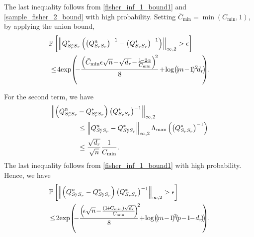 The last inequality follows from \eqref{fisher_inf_1_bound1} and \eqref{sample_fisher_2_bound} with high probability. Setting $\bar{C}_{\min}=\min\left(C_{\min},1\right)$, by applying the union bound,
\begin{equation}
\begin{aligned}
&\mathbb{P}\left[\norm{\fisher^*_{\support^c_\svert\support_\svert} \left(\left(\fisher^n_{\support_\svert\support_\svert}\right)^{-1} -\left(\fisher^*_{\support_\svert\support_\svert}\right)^{-1}\right)}{\infty,2}>\epsilon\right]\\
&\leq\! 4\!\exp\!\left(\!\!-\frac{\left(\bar{C}_{\min}\epsilon\sqrt{n}\!-\!\sqrt{d_\svert}\!-\!\frac{1\!-2\alpha}{C_{\min}}\right)^{\!2}}{8}\!+\!\log\!\left(\!(\!m\!-\!1\!)^2\!d_\svert\!\right)\!\!\!\right)\!\!.
\end{aligned}
\nonumber
\end{equation}

For the second term, we have
\begin{equation}
\begin{aligned}
&\left\|\left(Q^n_{S^c_{r}S_{r}}-Q^*_{S^c_{r}S_{r}}\right) \left(Q^*_{S_{r}S_{r}}\right)^{-1}\right\|_{\infty,2}\\ &\qquad\qquad\leq \left\|Q^n_{S^c_{r}S_{r}}-Q^*_{S^c_{r}S_{r}}\right\|_{\infty,2} \Lambda_{\max}\left(\left(Q^*_{S_{r}S_{r}}\right)^{-1}\right)\\
&\qquad\qquad\leq\frac{\sqrt{d_{r}}}{\sqrt{n}}\frac{1}{C_{\min}}.
\end{aligned}
\nonumber
\end{equation}
The last inequality follows from \eqref{fisher_inf_1_bound1} with high probability. Hence, we have
\begin{equation}
\begin{aligned}
&\mathbb{P}\left[\norm{\left(\fisher^n_{\support^c_\svert\support_\svert} -\fisher^*_{\support^c_\svert\support_\svert}\right) \left(\fisher^*_{\support_\svert\support_\svert}\right)^{-1}}{\infty,2}>\epsilon\right]\\ &\!\leq\! 2\!\exp\!\left(\!\!-\frac{\left(\!\epsilon\sqrt{n}\!-\!\frac{\left(1\!+\!C_{\min}\right)\sqrt{d_\svert}}{C_{\min}}\!\right)^{\!2}\!\!}{8}\!+\!\log\!\left(\!(\!m\!-\!1\!)^{\!2}\!(\!p\!-\!1\!\!-\!d_\svert\!)\!\right)\!\!\!\right)\!\!.
\end{aligned}
\nonumber
\end{equation}

